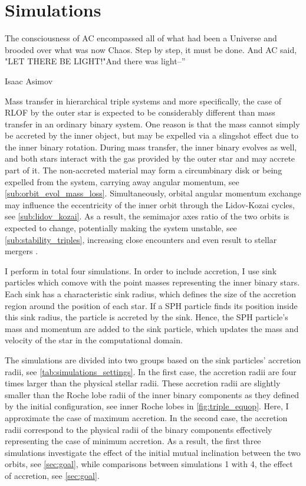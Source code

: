 \chapter{Simulations}\label{simulations}

\epigraph{The consciousness of AC encompassed all of what had been a Universe and brooded over what was now Chaos. Step by step, it must be done. And AC said, "LET THERE BE LIGHT!"And there was light--”}{Isaac Asimov}


Mass transfer in hierarchical triple
systems and more specifically, the case of RLOF by the outer star is expected to be considerably different than mass transfer in an ordinary binary system. One reason is that the mass cannot simply be accreted by the inner
object, but may be expelled via a slingshot effect due to the inner binary rotation. During mass transfer, the inner binary evolves as well, and both stars interact with the gas provided by the outer star and may accrete part of it. The non-accreted material may form a circumbinary disk or being expelled from the system, carrying away angular momentum, see \cref{sub:orbit_evol_mass_loss}. Simultaneously, orbital angular momentum exchange may influence the eccentricity of the inner orbit through the Lidov-Kozai cycles, see \cref{sub:lidov_kozai}. As a result, the semimajor axes ratio of the two orbits is expected to change, potentially making the system unstable, see \cref{sub:stability_triples}, increasing close encounters and even result to stellar mergers \citep{antonini2017binary,silsbee2017lidov,vigna2021massive}.

I perform in total four simulations. In order to include accretion, I use sink particles which comove with the point masses representing the inner binary stars. Each sink has a characteristic sink radius, which defines the size of the accretion region around the position of each star. If a SPH particle finds its position inside this sink radius, the particle is accreted by the sink. Hence, the SPH particle's mass and momentum are added to the sink particle, which updates the mass and velocity of the star in the computational domain.

The simulations are divided into two groups based on the sink particles' accretion radii, see \cref{tab:simulations_settings}. In the first case, the accretion radii are four times larger than the physical stellar radii. These accretion radii are slightly smaller than the Roche lobe radii of the inner binary components as they defined by the initial configuration, see inner Roche lobes in \cref{fig:triple_equop}. Here, I approximate the case of maximum accretion. In the second case, the accretion radii correspond to the physical radii of the binary components effectively representing the case of minimum accretion. As a result, the first three simulations investigate the effect of the initial mutual inclination between the two orbits, see \cref{sec:goal}, while comparisons between simulations 1 with 4, the effect of accretion, see \cref{sec:goal}. 

